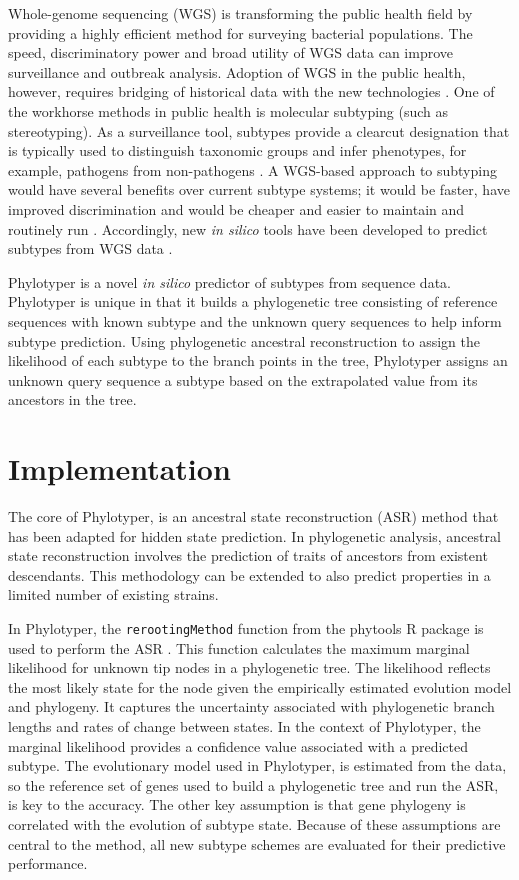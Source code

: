 \documentclass{bioinfo}
\begin{document}
Whole-genome sequencing (WGS) is transforming the public health field by providing a highly efficient method for surveying bacterial populations.
The speed, discriminatory power and broad utility of WGS data can improve surveillance and outbreak analysis.
Adoption of WGS in the public health, however, requires bridging of historical data with the new technologies \citep{Jenkins2015}.
One of the workhorse methods in public health is molecular subtyping (such as stereotyping).
As a surveillance tool, subtypes provide a clearcut designation that is typically used to distinguish taxonomic groups and infer phenotypes, for example, pathogens from non-pathogens \citep{Jenkins2015}.
A WGS-based approach to subtyping would have several benefits over current subtype systems; it would be faster, have improved discrimination and would be cheaper and easier to maintain and routinely run \citep{Jenkins2015}.
Accordingly, new \textit{in silico} tools have been developed to predict subtypes from WGS data \citep{Inouye2014,Joensen2015,Ingle2016,Lindsey2016,CARRILLO2016}.

Phylotyper is a novel \textit{in silico} predictor of subtypes from sequence data. 
Phylotyper is unique in that it builds a phylogenetic tree consisting of reference sequences with known subtype and the unknown query sequences to help inform subtype prediction. 
Using phylogenetic ancestral reconstruction to assign the likelihood of each subtype to the branch points in the tree, Phylotyper assigns an unknown query sequence a subtype based on the extrapolated value from its ancestors in the tree.

\section{Implementation}

The core of Phylotyper, is an ancestral state reconstruction (ASR) method that has been adapted for hidden state prediction.
In phylogenetic analysis, ancestral state reconstruction involves the prediction of traits of ancestors from existent descendants.
This methodology can be extended to also predict properties in a limited number of existing strains.

In Phylotyper, the \texttt{rerootingMethod} function from the phytools R package is used to perform the ASR \citep{Revell2011}.
This function calculates the maximum marginal likelihood for unknown tip nodes in a phylogenetic tree.
The likelihood reflects the most likely state for the node given the empirically estimated evolution model and phylogeny.
It captures the uncertainty associated with phylogenetic branch lengths and rates of change between states.
In the context of Phylotyper, the marginal likelihood provides a confidence value associated with a predicted subtype.
The evolutionary model used in Phylotyper, is estimated from the data, so the reference set of genes used to build a phylogenetic tree and run the ASR, is key to the accuracy.
The other key assumption is that gene phylogeny is correlated with the evolution of subtype state.
Because of these assumptions are central to the method, all new subtype schemes are evaluated for their predictive performance.
\end{document}
